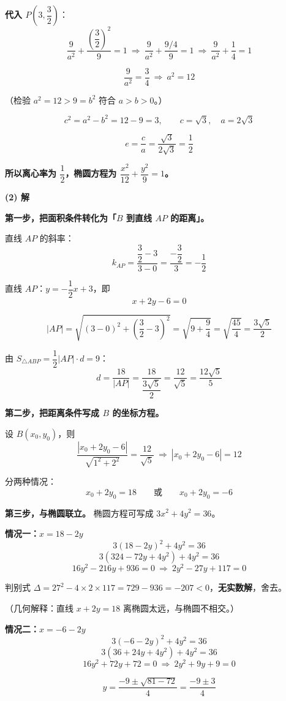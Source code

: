 \textbf{代入 $P\left(3,\dfrac32\right)$}：
\[\frac9{a^{2}}+\frac{\left(\dfrac32\right)^{2}}9=1\ \Longrightarrow\ \frac9{a^{2}}+\frac{9/4}9=1\ \Longrightarrow\ \frac9{a^{2}}+\frac14=1\]

\[\frac9{a^{2}}=\frac34\ \Longrightarrow\ a^{2}=12\]

（检验 $a^{2}=12>9=b^{2}$  符合 $a>b>0$。）

\[c^{2}=a^{2}-b^{2}=12-9=3,\qquad c=\sqrt3,\quad a=2\sqrt3\]

\[e=\frac ca=\frac{\sqrt3}{2\sqrt3}=\frac12\]

\textbf{所以离心率为 $\dfrac12$，椭圆方程为 $\dfrac{x^{2}}{12}+\dfrac{y^{2}}9=1$。}

\par\medskip

\textbf{(2) 解}

\textbf{第一步，把面积条件转化为「$B$ 到直线 $AP$ 的距离」。}

直线 $AP$ 的斜率：
\[k_{AP}=\frac{\dfrac32-3}{3-0}=\frac{-\dfrac32}3=-\frac12\]

直线 $AP$：$y=-\dfrac12x+3$，即
\[x+2y-6=0\]

\[|AP|=\sqrt{(3-0)^{2}+\left(\frac32-3\right)^{2}}=\sqrt{9+\frac94}=\sqrt{\frac{45}4}=\frac{3\sqrt5}2\]

由 $S_{\triangle ABP}=\dfrac12|AP|\cdot d=9$：
\[d=\frac{18}{|AP|}=\frac{18}{\dfrac{3\sqrt5}2}=\frac{12}{\sqrt5}=\frac{12\sqrt5}5\]

\textbf{第二步，把距离条件写成 $B$ 的坐标方程。}

设 $B\left(x_0,y_0\right)$，则
\[\frac{\left|x_0+2y_0-6\right|}{\sqrt{1^{2}+2^{2}}}=\frac{12}{\sqrt5}\ \Longrightarrow\ \left|x_0+2y_0-6\right|=12\]

分两种情况：
\[x_0+2y_0=18\qquad\text{或}\qquad x_0+2y_0=-6\]

\textbf{第三步，与椭圆联立。} 椭圆方程可写成 $3x^{2}+4y^{2}=36$。

\textbf{情况一：$x=18-2y$}
\[3(18-2y)^{2}+4y^{2}=36\]
\[3\left(324-72y+4y^{2}\right)+4y^{2}=36\]
\[16y^{2}-216y+936=0\ \Longrightarrow\ 2y^{2}-27y+117=0\]

判别式 $\Delta=27^{2}-4\times2\times117=729-936=-207<0$，\textbf{无实数解}，舍去。

（几何解释：直线 $x+2y=18$ 离椭圆太远，与椭圆不相交。）

\textbf{情况二：$x=-6-2y$}
\[3(-6-2y)^{2}+4y^{2}=36\]
\[3\left(36+24y+4y^{2}\right)+4y^{2}=36\]
\[16y^{2}+72y+72=0\ \Longrightarrow\ 2y^{2}+9y+9=0\]

\[y=\frac{-9\pm\sqrt{81-72}}4=\frac{-9\pm3}4\]

